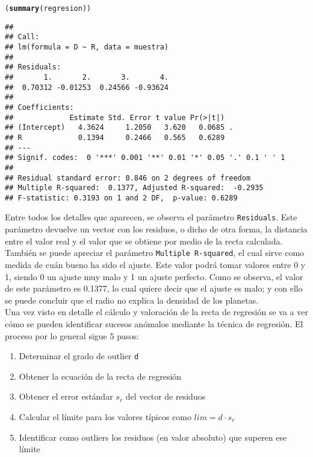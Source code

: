 \documentclass[12pt]{report}\usepackage[]{graphicx}\usepackage[dvipsnames]{xcolor}
\makeatletter
\newcommand{\hlstd}[1]{\textcolor[rgb]{0.345,0.345,0.345}{#1}}%
\newcommand{\hlkwd}[1]{\textcolor[rgb]{0.737,0.353,0.396}{\textbf{#1}}}%
\newenvironment{kframe}{%
 \def\at@end@of@kframe{}%
 \ifinner\ifhmode%
  \def\at@end@of@kframe{\end{minipage}}%
  \begin{minipage}{\columnwidth}%
 \fi\fi%
 \def\FrameCommand##1{\hskip\@totalleftmargin \hskip-\fboxsep
 \colorbox{shadecolor}{##1}\hskip-\fboxsep
     \hskip-\linewidth \hskip-\@totalleftmargin \hskip\columnwidth}%
 \MakeFramed {\advance\hsize-\width
   \@totalleftmargin\z@ \linewidth\hsize
   \@setminipage}}%
 {\par\unskip\endMakeFramed%
 \at@end@of@kframe}
\newenvironment{knitrout}{}{} %
\makeatother
\begin{document}
\begin{knitrout}
\color{fgcolor}\begin{kframe}
\begin{alltt}
\hlstd{(}\hlkwd{summary}\hlstd{(regresion))}
\end{alltt}
\begin{verbatim}
## 
## Call:
## lm(formula = D ~ R, data = muestra)
## 
## Residuals:
##       1.       2.       3.       4. 
##  0.70312 -0.01253  0.24566 -0.93624 
## 
## Coefficients:
##             Estimate Std. Error t value Pr(>|t|)  
## (Intercept)   4.3624     1.2050   3.620   0.0685 .
## R             0.1394     0.2466   0.565   0.6289  
## ---
## Signif. codes:  0 '***' 0.001 '**' 0.01 '*' 0.05 '.' 0.1 ' ' 1
## 
## Residual standard error: 0.846 on 2 degrees of freedom
## Multiple R-squared:  0.1377,	Adjusted R-squared:  -0.2935 
## F-statistic: 0.3193 on 1 and 2 DF,  p-value: 0.6289
\end{verbatim}
\end{kframe}
\end{knitrout}
	 
	 Entre todos los detalles que aparecen, se observa el parámetro \texttt{Residuals}. Este parámetro devuelve un vector con los residuos, o dicho de otra forma, la distancia entre el valor real y el valor que se obtiene por medio de la recta calculada. También se puede apreciar el parámetro \texttt{Multiple R-squared}, el cual sirve como medida de cuán bueno ha sido el ajuste. Este valor podrá tomar valores entre 0 y 1, siendo 0 un ajuste muy malo y 1 un ajuste perfecto. Como se observa, el valor de este parámetro es 0.1377, lo cual quiere decir que el ajuste es malo; y con ello se puede concluir que el radio no explica la densidad de los planetas.\\
	 
	 Una vez visto en detalle el cálculo y valoración de la recta de regresión se va a ver cómo se pueden identificar sucesos anómalos mediante la técnica de regresión. El proceso por lo general sigue 5 pasos:
	 
	 \begin{enumerate}
	 	\item Determinar el grado de outlier \texttt{d}
	 	\item Obtener la ecuación de la recta de regresión
	 	\item Obtener el error estándar $s_r$ del vector de residuos
	 	\item Calcular el límite para los valores típicos como $lim = d \cdot s_r$
	 	\item Identificar como outliers los residuos (en valor absoluto) que superen ese límite
	 \end{enumerate}
	 
\end{document}
